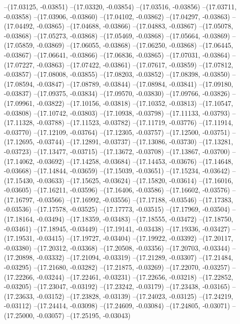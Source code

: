 --(17.03125, -0.03851)
--(17.03320, -0.03854)
--(17.03516, -0.03856)
--(17.03711, -0.03858)
--(17.03906, -0.03860)
--(17.04102, -0.03862)
--(17.04297, -0.03863)
--(17.04492, -0.03865)
--(17.04688, -0.03866)
--(17.04883, -0.03867)
--(17.05078, -0.03868)
--(17.05273, -0.03868)
--(17.05469, -0.03868)
--(17.05664, -0.03869)
--(17.05859, -0.03869)
--(17.06055, -0.03868)
--(17.06250, -0.03868)
--(17.06445, -0.03867)
--(17.06641, -0.03866)
--(17.06836, -0.03865)
--(17.07031, -0.03864)
--(17.07227, -0.03863)
--(17.07422, -0.03861)
--(17.07617, -0.03859)
--(17.07812, -0.03857)
--(17.08008, -0.03855)
--(17.08203, -0.03852)
--(17.08398, -0.03850)
--(17.08594, -0.03847)
--(17.08789, -0.03844)
--(17.08984, -0.03841)
--(17.09180, -0.03837)
--(17.09375, -0.03834)
--(17.09570, -0.03830)
--(17.09766, -0.03826)
--(17.09961, -0.03822)
--(17.10156, -0.03818)
--(17.10352, -0.03813)
--(17.10547, -0.03808)
--(17.10742, -0.03803)
--(17.10938, -0.03798)
--(17.11133, -0.03793)
--(17.11328, -0.03788)
--(17.11523, -0.03782)
--(17.11719, -0.03776)
--(17.11914, -0.03770)
--(17.12109, -0.03764)
--(17.12305, -0.03757)
--(17.12500, -0.03751)
--(17.12695, -0.03744)
--(17.12891, -0.03737)
--(17.13086, -0.03730)
--(17.13281, -0.03723)
--(17.13477, -0.03715)
--(17.13672, -0.03708)
--(17.13867, -0.03700)
--(17.14062, -0.03692)
--(17.14258, -0.03684)
--(17.14453, -0.03676)
--(17.14648, -0.03668)
--(17.14844, -0.03659)
--(17.15039, -0.03651)
--(17.15234, -0.03642)
--(17.15430, -0.03633)
--(17.15625, -0.03624)
--(17.15820, -0.03614)
--(17.16016, -0.03605)
--(17.16211, -0.03596)
--(17.16406, -0.03586)
--(17.16602, -0.03576)
--(17.16797, -0.03566)
--(17.16992, -0.03556)
--(17.17188, -0.03546)
--(17.17383, -0.03536)
--(17.17578, -0.03525)
--(17.17773, -0.03515)
--(17.17969, -0.03504)
--(17.18164, -0.03494)
--(17.18359, -0.03483)
--(17.18555, -0.03472)
--(17.18750, -0.03461)
--(17.18945, -0.03449)
--(17.19141, -0.03438)
--(17.19336, -0.03427)
--(17.19531, -0.03415)
--(17.19727, -0.03404)
--(17.19922, -0.03392)
--(17.20117, -0.03380)
--(17.20312, -0.03368)
--(17.20508, -0.03356)
--(17.20703, -0.03344)
--(17.20898, -0.03332)
--(17.21094, -0.03319)
--(17.21289, -0.03307)
--(17.21484, -0.03295)
--(17.21680, -0.03282)
--(17.21875, -0.03269)
--(17.22070, -0.03257)
--(17.22266, -0.03244)
--(17.22461, -0.03231)
--(17.22656, -0.03218)
--(17.22852, -0.03205)
--(17.23047, -0.03192)
--(17.23242, -0.03179)
--(17.23438, -0.03165)
--(17.23633, -0.03152)
--(17.23828, -0.03139)
--(17.24023, -0.03125)
--(17.24219, -0.03112)
--(17.24414, -0.03098)
--(17.24609, -0.03084)
--(17.24805, -0.03071)
--(17.25000, -0.03057)
--(17.25195, -0.03043)
